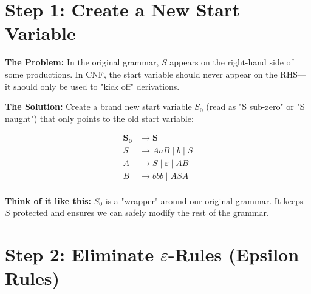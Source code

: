 \documentclass{article}
\begin{document}
\vspace{0.3cm}
\noindent{}

\section{Step 1: Create a New Start Variable}



  
    
  
    
  
    
      
    
  

  
    
      
    
  
    
  
    
  

  
    
  
    
      
    
  


\noindent\textbf{The Problem:} In the original grammar, $S$ appears on the right-hand side of some productions. In CNF, the start variable should never appear on the RHS—it should only be used to "kick off" derivations.

\noindent\textbf{The Solution:} Create a brand new start variable $S_0$ (read as "S sub-zero" or "S naught") that only points to the old start variable:

\begin{align*}
    \mathbf{S_0} &\to \mathbf{S}\\
    S &\to AaB  \mid b  \mid S \\
    A &\to S  \mid \varepsilon  \mid AB \\
    B &\to bbb  \mid ASA \\
    \end{align*}

\noindent\textbf{Think of it like this:} $S_0$ is a "wrapper" around our original grammar. It keeps $S$ protected and ensures we can safely modify the rest of the grammar.

\section{Step 2: Eliminate $\varepsilon$-Rules (Epsilon Rules)}
\end{document}
